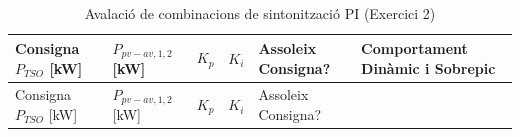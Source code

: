 \documentclass[
  catalan,
  letterpaper,
  DIV=11,
  numbers=noendperiod]{scrartcl}
\begin{document}
\begin{longtable}[]{@{}
  >{\raggedright\arraybackslash}p{}
  >{\raggedright\arraybackslash}p{}
  >{\raggedright\arraybackslash}p{}
  >{\raggedright\arraybackslash}p{}
  >{\raggedright\arraybackslash}p{}
  >{\raggedright\arraybackslash}p{}@{}}
\caption{Avalació de combinacions de sintonització PI (Exercici
2)}\label{tbl-ejercicio2}\tabularnewline
\toprule\noalign{}
\begin{minipage}[b]{\linewidth}\raggedright
Consigna \(P_{TSO}\) {[}kW{]}
\end{minipage} & \begin{minipage}[b]{\linewidth}\raggedright
\(P_{pv-av,1,2}\) {[}kW{]}
\end{minipage} & \begin{minipage}[b]{\linewidth}\raggedright
\(K_p\)
\end{minipage} & \begin{minipage}[b]{\linewidth}\raggedright
\(K_i\)
\end{minipage} & \begin{minipage}[b]{\linewidth}\raggedright
Assoleix Consigna?
\end{minipage} & \begin{minipage}[b]{\linewidth}\raggedright
Comportament Dinàmic i Sobrepic
\end{minipage} \\
\midrule\noalign{}
\endfirsthead
\toprule\noalign{}
\begin{minipage}[b]{\linewidth}\raggedright
Consigna \(P_{TSO}\) {[}kW{]}
\end{minipage} & \begin{minipage}[b]{\linewidth}\raggedright
\(P_{pv-av,1,2}\) {[}kW{]}
\end{minipage} & \begin{minipage}[b]{\linewidth}\raggedright
\(K_p\)
\end{minipage} & \begin{minipage}[b]{\linewidth}\raggedright
\(K_i\)
\end{minipage} & \begin{minipage}[b]{\linewidth}\raggedright
Assoleix Consigna?
\end{minipage} & \begin{minipage}[b]{\linewidth}\raggedright

\end{minipage}
\end{longtable}
\end{document}
